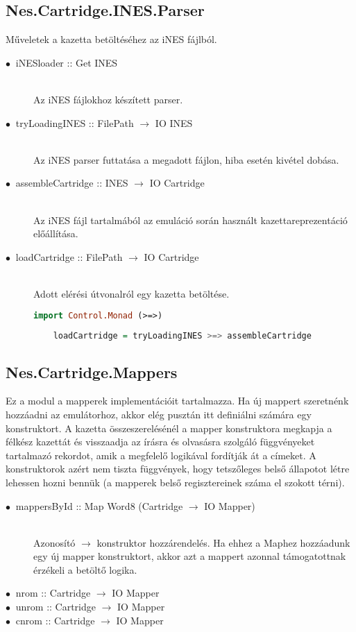 \subsection{Nes.Cartridge.INES.Parser}

Műveletek a kazetta betöltéséhez az iNES fájlból.

\begin{description}
	\item[$\bullet\:$ iNESloader :: Get INES] \hfill \\
	Az iNES fájlokhoz készített parser.
	\item[$\bullet\:$ tryLoadingINES :: FilePath $\rightarrow$ IO INES] \hfill \\
	Az iNES parser futtatása a megadott fájlon, hiba esetén kivétel dobása.
	\item[$\bullet\:$ assembleCartridge :: INES $\rightarrow$ IO Cartridge] \hfill \\
	Az iNES fájl tartalmából az emuláció során használt kazettareprezentáció előállítása.
	\item[$\bullet\:$ loadCartridge :: FilePath $\rightarrow$ IO Cartridge] \hfill \\
	Adott elérési útvonalról egy kazetta betöltése.
	\begin{lstlisting}[language=Haskell]
	import Control.Monad (>=>)
	
	loadCartridge = tryLoadingINES >=> assembleCartridge
	\end{lstlisting}
\end{description}

\subsection{Nes.Cartridge.Mappers}

Ez a modul a mapperek implementációit tartalmazza. Ha új mappert szeretnénk hozzáadni az emulátorhoz, akkor elég pusztán itt definiálni számára egy konstruktort. A kazetta összeszerelésénél a mapper konstruktora megkapja a félkész kazettát és visszaadja az írásra és olvasásra szolgáló függvényeket tartalmazó rekordot, amik a megfelelő logikával fordítják át a címeket.
A konstruktorok azért nem tiszta függvények, hogy tetszőleges belső állapotot létre lehessen hozni bennük (a mapperek belső regisztereinek száma el szokott térni).

\begin{description}
	\item[$\bullet\:$ mappersById :: Map Word8 (Cartridge $\rightarrow$ IO Mapper)] \hfill \\
	Azonosító $\rightarrow$ konstruktor hozzárendelés. Ha ehhez a Maphez hozzáadunk egy új mapper konstruktort, akkor azt a mappert azonnal támogatottnak érzékeli a betöltő logika.
	\item[$\bullet\:$ nrom  :: Cartridge $\rightarrow$ IO Mapper]
	\item[$\bullet\:$ unrom :: Cartridge $\rightarrow$ IO Mapper]
	\item[$\bullet\:$ cnrom :: Cartridge $\rightarrow$ IO Mapper]
\end{description}

